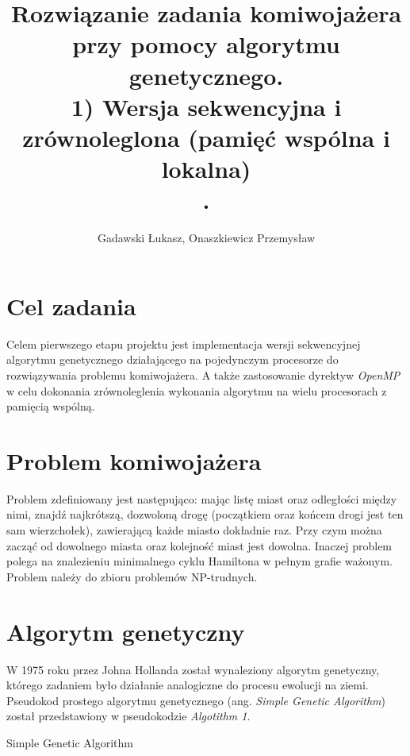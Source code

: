 \documentclass[10pt,a4paper]{article}
\author{Gadawski Łukasz, Onaszkiewicz Przemysław}
\title{Rozwiązanie zadania komiwojażera przy pomocy algorytmu genetycznego. \\ 1) Wersja sekwencyjna i zrównoleglona (pamięć wspólna i lokalna) \\ .}
\makeatletter
\def\BState{\State\hskip-\ALG@thistlm}
\makeatother
\begin{document}
\maketitle

\section{Cel zadania}
Celem pierwszego etapu projektu jest implementacja wersji sekwencyjnej algorytmu genetycznego działającego na pojedynczym procesorze do rozwiązywania problemu komiwojażera. A także zastosowanie dyrektyw \textit{OpenMP} w celu dokonania zrównoleglenia wykonania algorytmu na wielu procesorach z pamięcią wspólną.

\section{Problem komiwojażera}
Problem zdefiniowany jest następująco: mając listę miast oraz odległości między nimi, znajdź najkrótszą, dozwoloną drogę (początkiem oraz końcem drogi jest ten sam wierzchołek), zawierającą każde miasto dokładnie raz. Przy czym można zacząć od dowolnego miasta oraz kolejność miast jest dowolna. Inaczej problem polega na znalezieniu minimalnego cyklu Hamiltona w pełnym grafie ważonym. Problem należy do zbioru problemów NP-trudnych.

\section{Algorytm genetyczny}
W 1975 roku przez Johna Hollanda został wynaleziony algorytm genetyczny, którego zadaniem było działanie analogiczne do procesu ewolucji na ziemi. Pseudokod prostego algorytmu genetycznego (ang. \textit{Simple Genetic Algorithm}) został przedstawiony w pseudokodzie \textit{Algotithm 1}.

\begin{algorithm}
\caption{Simple Genetic Algorithm}\label{euclid}
\end{algorithm}
\end{document}
